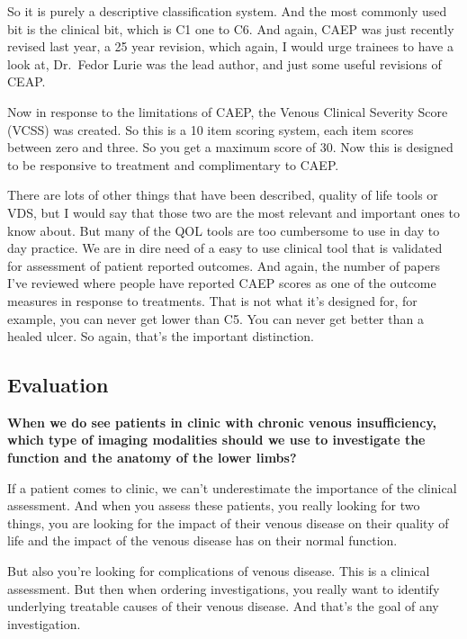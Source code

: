 \documentclass[
]{book}
\begin{document}
So it is purely a descriptive classification system. And the most
commonly used bit is the clinical bit, which is C1 one to C6. And again,
CAEP was just recently revised last year, a 25 year revision, which
again, I would urge trainees to have a look at, Dr.~Fedor Lurie was the
lead author, and just some useful revisions of CEAP.\citep{lurie2020}

Now in response to the limitations of CAEP, the Venous Clinical Severity
Score (VCSS) was created. So this is a 10 item scoring system, each item
scores between zero and three. So you get a maximum score of 30. Now
this is designed to be responsive to treatment and complimentary to
CAEP.\citep{vasquez2010}

There are lots of other things that have been described, quality of life
tools or VDS, but I would say that those two are the most relevant and
important ones to know about. But many of the QOL tools are too
cumbersome to use in day to day practice. We are in dire need of a easy
to use clinical tool that is validated for assessment of patient
reported outcomes. And again, the number of papers I've reviewed where
people have reported CAEP scores as one of the outcome measures in
response to treatments. That is not what it's designed for, for example,
you can never get lower than C5. You can never get better than a healed
ulcer. So again, that's the important distinction.

\hypertarget{evaluation-17}{%
\subsection{Evaluation}\label{evaluation-17}}

\textbf{When we do see patients in clinic with chronic venous insufficiency,
which type of imaging modalities should we use to investigate the
function and the anatomy of the lower limbs?}

If a patient comes to clinic, we can't underestimate the importance of
the clinical assessment. And when you assess these patients, you really
looking for two things, you are looking for the impact of their venous
disease on their quality of life and the impact of the venous disease
has on their normal function.

But also you're looking for complications of venous disease. This is a
clinical assessment. But then when ordering investigations, you really
want to identify underlying treatable causes of their venous disease.
And that's the goal of any investigation.
\end{document}

